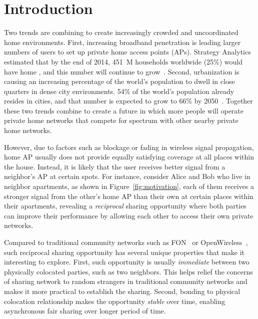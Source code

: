 \section{Introduction}
\label{sec-introduction}

Two trends are combining to create increasingly crowded and uncoordinated
home \wifi{} environments. First, increasing broadband penetration is leading
larger numbers of users to set up private home access points (APs). Strategy
Analytics estimated that by the end of 2014, 451~M households worldwide
(25\%) would have home \wifi{}, and this number will continue to
grow~\cite{wifi-survey}. Second, urbanization is causing an increasing
percentage of the world's population to dwell in close quarters in dense city
environments. 54\% of the world's population already resides in cities, and
that number is expected to grow to 66\% by 2050~\cite{urbanization-survey}.
Together these two trends combine to create a future in which more people
will operate private home networks that compete for spectrum with other
nearby private home networks.

However, due to factors such as blockage or fading in wireless signal
propagation, home \wifi{} AP usually does not provide equally satisfying \wifi{}
coverage at all places within the house. Instead, it is likely that the user
receives better \wifi{} signal from a neighbor's AP at certain spots. For
instance, consider Alice and Bob who live in neighbor apartments, as shown in
Figure~\ref{fig:motivation}, each of them receives a stronger \wifi{} signal
from the other's home AP than their own at certain places within their
apartments, revealing a \textit{reciprocal} \wifi{} sharing opportunity where
both parties can improve their \wifi{} performance by allowing each other to
access their own private networks.

Compared to traditional community networks such as FON~\cite{fon} or
OpenWireless~\cite{openwireless}, such reciprocal sharing opportunity has
several unique properties that make it interesting to explore. First, such
opportunity is usually \textit{immediate} between two physically colocated
parties, such as two neighbors. This helps relief the concerns of sharing
network to random strangers in traditional community networks and makes it more
practical to establish the sharing. Second, bonding to physical colocation
relationship makes the opportunity \textit{stable} over time, enabling
asynchronous fair sharing over longer period of time.

